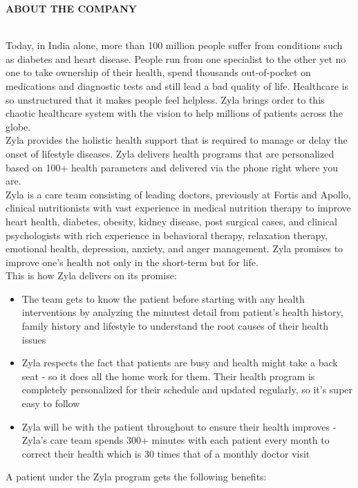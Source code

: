 \documentclass[a4paper,11pt]{article}
\begin{document}
\newpage
{\LARGE \bfseries ABOUT THE COMPANY}
\vspace*{5mm}
\medskip\\
Today, in India alone, more than 100 million people suffer from conditions such as diabetes and heart disease. People run from one specialist to the other yet no one to take ownership of their health, spend thousands out-of-pocket on medications and diagnostic tests and still lead a bad quality of life. Healthcare is so unstructured that it makes people feel helpless. Zyla brings order to this chaotic healthcare system with the vision to help millions of patients across the globe.
\medskip\\
Zyla provides the holistic health support that is required to manage or delay the onset of lifestyle diseases. Zyla delivers health programs that are personalized based on 100+ health parameters and delivered via the phone right where you are.
\medskip\\
Zyla is a care team consisting of leading doctors, previously at Fortis and Apollo, clinical nutritionists with vast experience in medical nutrition therapy to improve heart health, diabetes, obesity, kidney disease, post surgical cases, and clinical psychologists with rich experience in behavioral therapy, relaxation therapy, emotional health, depression, anxiety, and anger management. Zyla promises to improve one's health not only in the short-term but for life.
\medskip\\
This is how Zyla delivers on its promise:
\begin{itemize}
    \item The team gets to know the patient before starting with any health interventions by analyzing the minutest detail from patient's health history, family history and lifestyle to understand the root causes of their health issues
    \item Zyla respects the fact that patients are busy and health might take a back seat - so it does all the home work for them. Their health program is completely personalized for their schedule and updated regularly, so it’s super easy to follow
    \item Zyla will be with the patient throughout to ensure their health improves - Zyla’s care team spends 300+ minutes with each patient every month to correct their health which is 30 times that of a monthly doctor visit
\end{itemize}
A patient under the Zyla program gets the following benefits:
\end{document}
